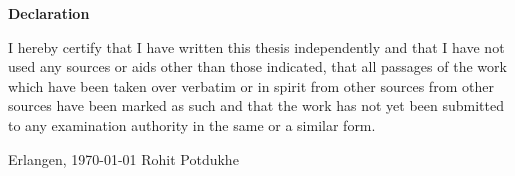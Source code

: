 \documentclass[12pt,oneside,reqno,a4paper,twoside]{report}
\begin{document}
\clearpage
\printunsrtglossary[type=abbreviations]


\clearpage
{}
%


%





\clearpage\thispagestyle{empty}



\begin{center}\textbf{\large Declaration}\end{center}

\noindent
 I hereby certify that I have written this thesis independently
and that I have not used any sources or aids other than those indicated,
that all passages of the work which have been taken over verbatim or in spirit from other sources
from other sources have been marked as such and that the work 
has not yet been submitted to any examination authority in the same or a similar form.


\vspace{4\baselineskip}

\noindent
Erlangen, \today \hspace*{2cm} Rohit Potdukhe


%
\end{document}
